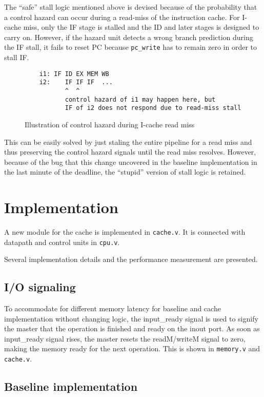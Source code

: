 \documentclass[12pt]{article}
\begin{document}
The ``safe'' stall logic mentioned above is devised because of the
probability that a control hazard can occur during a read-miss of the
instruction cache.  For I-cache miss, only the IF stage is stalled and
the ID and later stages is designed to carry on.  However, if the
hazard unit detects a wrong branch prediction during the IF stall, it
fails to reset PC because \verb|pc_write| has to remain zero in order
to stall IF.

\begin{figure}[ht]
  \centering
  \begin{BVerbatim}
    i1: IF ID EX MEM WB
    i2:    IF IF IF  ...
           ^  ^
           control hazard of i1 may happen here, but
           IF of i2 does not respond due to read-miss stall
  \end{BVerbatim}
  \caption{Illustration of control hazard during I-cache read miss}
\end{figure}

This can be easily solved by just staling the entire pipeline for a
read miss and thus preserving the control hazard signals until the
read miss resolves.  However, because of the bug that this change
uncovered in the baseline implementation in the last minute of the
deadline, the ``stupid'' version of stall logic is retained.

\section{Implementation}

A new module for the cache is implemented in \verb|cache.v|.  It is
connected with datapath and control units in \verb|cpu.v|.

Several implementation details and the performance measurement are
presented.

\subsection{I/O signaling} \label{sec:signal}

To accommodate for different memory latency for baseline and cache
implementation without changing logic, the input\_ready signal is used
to signify the master that the operation is finished and ready on the
inout port.  As soon as input\_ready signal rises, the master resets
the readM/writeM signal to zero, making the memory ready for the next
operation.  This is shown in \verb|memory.v| and \verb|cache.v|.

\subsection{Baseline implementation}
\end{document}
